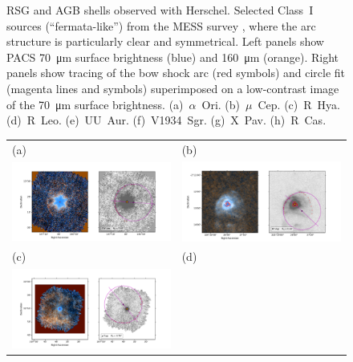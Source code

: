 \documentclass[useAMS, usenatbib, a4paper]{mnras}
\begin{document}
\begin{figure}
\begin{tabular}{ll}
  \end{tabular}
  \caption{RSG and AGB shells observed with Herschel.  Selected
    Class~I sources (``fermata-like'') from the MESS survey
    \citet{Cox:2012a}, where the arc structure is particularly clear
    and symmetrical.  Left panels show PACS \SI{70}{\um} surface
    brightness (blue) and \SI{160}{\um} (orange).  Right panels show
    tracing of the bow shock arc (red symbols) and circle fit (magenta
    lines and symbols) superimposed on a low-contrast image of the
    \SI{70}{\um} surface brightness. (a)~\(\alpha\)~Ori. (b)~\(\mu\)~Cep.
    (c)~R~Hya. (d)~R~Leo. (e)~UU~Aur. (f)~V1934~Sgr. (g)~X~Pav.
    (h)~R~Cas.}
  \label{fig:herschel-arc-fits}
\end{figure}

\begin{figure}
  \setlength\tabcolsep{0pt}
  \begin{tabular}{ll}
    (a) & (b) \\
    \includegraphics[trim=10 0 65 20, clip]{figs/cwleo-imageplot}
    & \includegraphics[trim=10 0 65 20, clip]{figs/epaqr-imageplot} \\
    (c) & (d) \\
    \includegraphics[trim=10 0 65 20, clip]{figs/khicyg-imageplot}

\end{tabular}
\end{figure}
\end{document}
